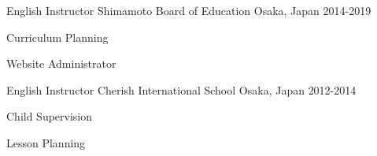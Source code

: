

\begin{cventries}


    \cventry
        {English Instructor} %
        {Shimamoto Board of Education} %
        {Osaka, Japan} %
        {2014-2019} %
        {
            \begin{cvitems} %
            \item {Curriculum Planning}
            \item {Website Administrator}
            \end{cvitems}
        }

    \cventry
        {English Instructor} %
        {Cherish International School} %
        {Osaka, Japan} %
        {2012-2014} %
        {
            \begin{cvitems} %
            \item {Child Supervision}
            \item {Lesson Planning}
            \end{cvitems}
        }

\end{cventries}
